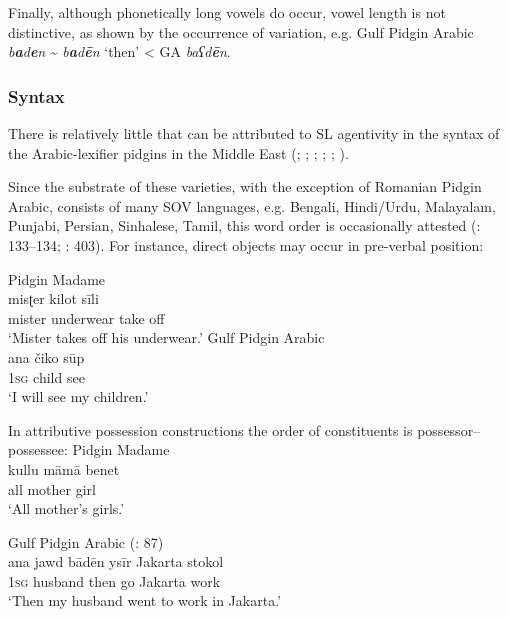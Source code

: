 \documentclass[output=paper]{langsci/langscibook}
\begin{document}
Finally, although phonetically long vowels do occur, vowel length is not distinctive, as shown by the occurrence of variation, e.g. Gulf Pidgin Arabic \textit{b\textbf{a}d\textbf{e}n} {\textasciitilde} \textit{b\textbf{a}d\textbf{ē}n} ‘then’ < GA \textit{baʕd\textbf{ē}n}. 


 \subsubsection{Syntax} 

There is relatively little that can be attributed to SL agentivity in the syntax of the Arabic-lexifier pidgins in the Middle East (\citealt{Almoaily2013}; \citealt{Al-Salman2013}; \citealt{Avram2014Pidgin}; \citealt{Bizri2014}; \citealt{Avram2017article}; \citealt{Bakir2017}).

Since the substrate of these varieties, with the exception of Romanian Pidgin Arabic, consists of many SOV languages, e.g. Bengali, Hindi/Urdu, Malayalam, Punjabi, Persian, Sinhalese, Tamil, this word order is occasionally attested (\citealt{Avram2017article}: 133–134; \citealt{Bizri2014}: 403). For instance, direct objects may occur in pre-verbal position:                                                              


\ea
\ea Pidgin Madame \citep[227]{Bizri2010}\\
\gll     misʈer kilot sīli\\
         mister underwear take off\\
\glt       `Mister takes off his underwear.'     
\newpage
\ex Gulf Pidgin Arabic \citep[133]{Avram2017article}\\
\gll     ana čiko sūp\\
         1\textsc{sg} child see\\
\glt       `I will see my children.'                                        
\z                                             
\z

In attributive possession constructions the order of constituents is possessor–possessee:                                                                                        
\ea\label{ex:key:}
\ea Pidgin Madame \citep[198]{Bizri2010} \\
\gll     kullu māmā benet \\
         all mother girl    \\
\glt `All mother’s girls.'

\ex Gulf Pidgin Arabic (\citealt{Næss2008}: 87)\\
\gll     ana jawd bādēn ysīr Jakarta stokol\\
         1\textsc{sg} husband then go Jakarta work\\
\glt       `Then my husband went to work in Jakarta.' 
\z
\z
\end{document}
